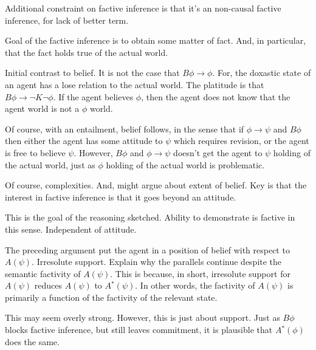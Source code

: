 \documentclass[10pt]{article}
\newcommand{\nf}[1]{#1\ensuremath{^{{*}}}}
\begin{document}
\begin{note}
  Additional constraint on factive inference is that it's an non-causal factive inference, for lack of better term.

  Goal of the factive inference is to obtain some matter of fact.
  And, in particular, that the fact holds true of the actual world.

  Initial contrast to belief.
  It is not the case that \(B\phi \rightarrow \phi\).
  For, the doxastic state of an agent has a lose relation to the actual world.
  The platitude is that \(B\phi \rightarrow \lnot K \lnot \phi\).
  If the agent believes \(\phi\), then the agent does not know that the agent world is not a \(\phi\) world.

  Of course, with an entailment, belief follows, in the sense that if \(\phi \rightarrow \psi\) and \(B\phi\) then either the agent has some attitude to \(\psi\) which requires revision, or the agent is free to believe \(\psi\).
  However, \(B\phi\) and \(\phi \rightarrow \psi\) doesn't get the agent to \(\psi\) holding of the actual world, just as \(\phi\) holding of the actual world is problematic.

  Of course, complexities.
  And, might argue about extent of belief.
  Key is that the interest in factive inference is that it goes beyond an attitude.

  This is the goal of the reasoning sketched.
  Ability to demonstrate is factive in this sense.
  Independent of attitude.

  The {\color{red} preceding argument} put the agent in a position of belief with respect to \(A(\psi)\).
  Irresolute support.
  Explain why the parallels continue despite the semantic factivity of \(A(\psi)\).
  This is because, in short, irresolute support for \(A(\psi)\) reduces \(A(\psi)\) to \(\nf{A}(\psi)\).
  In other words, the factivity of \(A(\psi)\) is primarily a function of the factivity of the relevant state.

  This may seem overly strong.
  However, this is just about support.
  Just as \(B\phi\) blocks factive inference, but still leaves commitment, it is plausible that \(\nf{A}(\phi)\) does the same.
\end{note}
\end{document}
